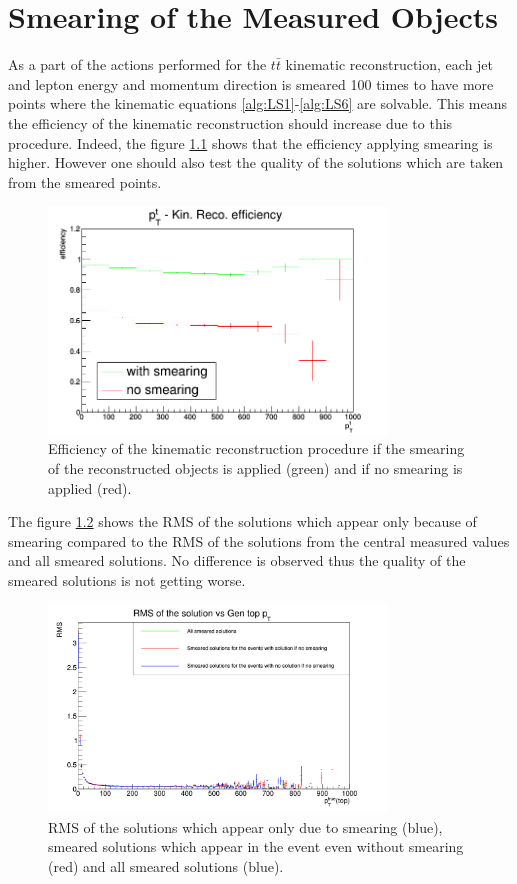 \chapter{Smearing of the Measured Objects}\label{appendix:smear}

As a part of the actions performed for the $t\bar{t}$ kinematic reconstruction, each jet and lepton energy 
and momentum direction is smeared 100 times to have more points where the kinematic equations \ref{alg:LS1}-\ref{alg:LS6} 
are solvable. This means the efficiency of the kinematic reconstruction should increase due to this procedure.
Indeed, the figure \ref{fig:SmearEff} shows that the efficiency applying smearing is higher. However one should also test the
quality of the solutions which are taken from the smeared points.

\begin{figure}[h]
  \centering
  \includegraphics[width=0.8\textwidth]{10_appendices/smearing/Smereff.png}
  \caption{Efficiency of the kinematic reconstruction procedure if the smearing of the reconstructed objects is applied (green)
  and if no smearing is applied (red).}
  \label{fig:SmearEff}
\end{figure}

The figure \ref{fig:RMSsmear} shows the RMS of the solutions which appear only because of smearing compared to the RMS of the
solutions from the central measured values and all smeared solutions. No difference is observed thus the quality of
the smeared solutions is not getting worse.

\begin{figure}[t]
  \centering
  \includegraphics[width=0.8\textwidth]{10_appendices/smearing/RMS.png}
  \caption{RMS of the solutions which appear only due to smearing (blue), smeared solutions which appear in the 
  event even without smearing (red) and all smeared solutions (blue).}
  \label{fig:RMSsmear}
\end{figure}